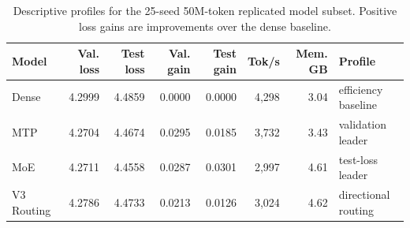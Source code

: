 \begin{table}[htbp]
\centering
\small
\caption{Descriptive profiles for the 25-seed 50M-token replicated model subset. Positive loss gains are improvements over the dense baseline.}
\label{tab:main-large-50m-model-diagnostics}
\begin{tabular}{lrrrrrrl}
\toprule
Model & Val. loss & Test loss & Val. gain & Test gain & Tok/s & Mem. GB & Profile \\
\midrule
Dense & 4.2999 & 4.4859 & 0.0000 & 0.0000 & 4,298 & 3.04 & efficiency baseline \\
MTP & 4.2704 & 4.4674 & 0.0295 & 0.0185 & 3,732 & 3.43 & validation leader \\
MoE & 4.2711 & 4.4558 & 0.0287 & 0.0301 & 2,997 & 4.61 & test-loss leader \\
V3 Routing & 4.2786 & 4.4733 & 0.0213 & 0.0126 & 3,024 & 4.62 & directional routing \\
\bottomrule
\end{tabular}
\end{table}
